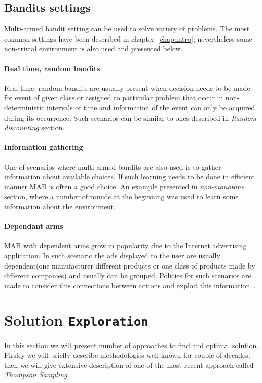 \documentclass[12pt, a4paper, pdflatex, leqno]{report}
\begin{document}
\section{Bandits settings}
Multi-armed bandit setting can be used to solve variety of problems. The most common settings have been described in chapter~\ref{chap:intro}; nevertheless some non-trivial environment is also used and presented below.\\
\subsubsection{Real time, random bandits}
Real time, random bandits are usually present when decision needs to be made for event of given class or assigned to particular problem that occur in non-deterministic intervals of time and information of the event can only be acquired during its occurrence. Such scenarios can be similar to ones described in \emph{Random discounting} section.\\
\subsubsection{Information gathering}
One of scenarios where multi-armed bandits are also used is to gather information about available choices. If such learning needs to be done in efficient manner MAB is often a good choice. An example presented in \emph{non-monotone} section, where a number of rounds at the beginning was used to learn some information about the environment.\\
\subsubsection{Dependant arms}
MAB with dependent arms grow in popularity due to the Internet advertising application. In such scenario the ads displayed to the user are usually dependent(one manufacturer different products or one class of products made by different companies) and usually can be grouped. Policies for such scenarios are made to consider this connections between actions and exploit this information~\citep{Pandey:2007:MBP:1273496.1273587}.\\





\chapter{Solution \texttt{\textbf{Exploration}}}
In this section we will present number of approaches to find and optimal solution. Firstly we will briefly describe methodologies well known for couple of decades; then we will give extensive description of one of the most recent approach called \emph{Thompson Sampling}.\\
\end{document}
